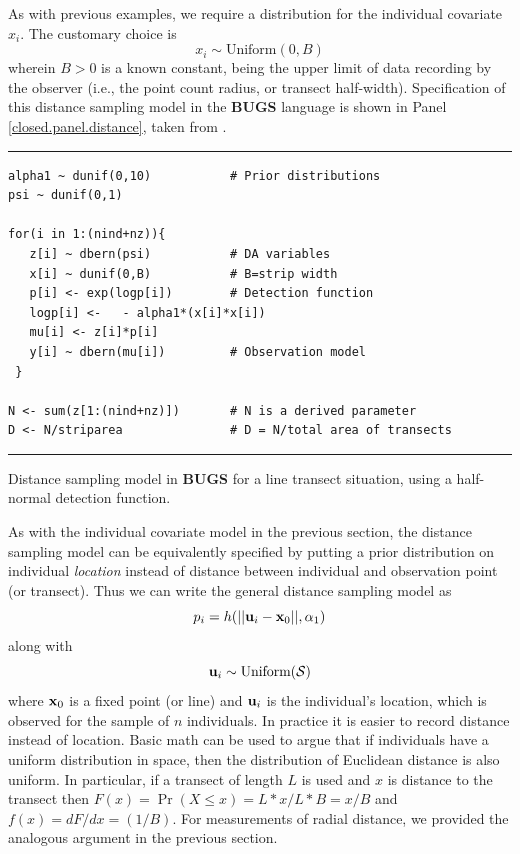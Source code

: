 As with previous examples, we require a distribution for the
individual covariate $x_{i}$. The customary choice is
\[
x_{i} \sim \mbox{Uniform}(0,B)
\]
wherein $B>0$ is a known constant, being the upper limit of data
recording by the observer (i.e., the point count radius, or transect
half-width). 
Specification of this distance sampling model in the {\bf BUGS}
language  is
shown in Panel \ref{closed.panel.distance}, taken from \citet{royle_dorazio:2008}.


\begin{panel}[ht]
\centering
\rule[0.15in]{\textwidth}{.03in}
\begin{minipage}{5in}
\begin{verbatim}
alpha1 ~ dunif(0,10)           # Prior distributions
psi ~ dunif(0,1)

for(i in 1:(nind+nz)){
   z[i] ~ dbern(psi)           # DA variables
   x[i] ~ dunif(0,B)           # B=strip width
   p[i] <- exp(logp[i])        # Detection function
   logp[i] <-   - alpha1*(x[i]*x[i])
   mu[i] <- z[i]*p[i]
   y[i] ~ dbern(mu[i])         # Observation model 
 }

N <- sum(z[1:(nind+nz)])       # N is a derived parameter
D <- N/striparea               # D = N/total area of transects
\end{verbatim}
\end{minipage}
\rule[-0.15in]{\textwidth}{.03in}
\caption{Distance sampling model in {\bf BUGS} for a line transect situation, using a half-normal
detection function.}
\label{closed.panel.distance}
\end{panel}

As with the individual covariate model in the previous section, the
distance sampling model can be equivalently specified by putting a
prior distribution on individual {\it location} instead of distance
between individual and observation point (or transect).  Thus we can
write the general distance sampling model as
\[
p_{i} = h(||{\bf u}_{i} - {\bf x}_0||,\alpha_{1})
\]
along with
\[
 {\bf u}_{i} \sim \mbox{Uniform}({\cal S})
\]
where ${\bf x}_{0}$ is a fixed point (or line) and ${\bf u}_{i}$ is
the individual's location, which is observed for the sample of $n$
individuals. In practice it is easier to record distance instead of
location.  Basic math can be used to argue that if individuals have a
uniform distribution in space, then the distribution of Euclidean
distance is also uniform. In particular, if a transect of length $L$
is used and $x$ is distance to the transect then $F(x) = \Pr(X\le x) =
L*x/L*B = x/B$ and $f(x) = dF/dx = (1/B)$. For measurements of radial
distance, we provided the analogous argument in the previous section.


